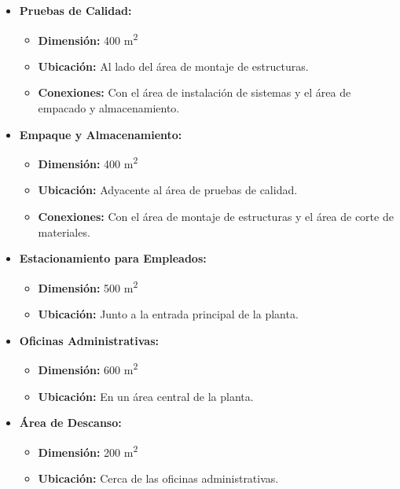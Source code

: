 \begin{itemize}
    \item \textbf{Pruebas de Calidad:}
    \begin{itemize}
        \item \textbf{Dimensión:} 400 m\textsuperscript{2}
        \item \textbf{Ubicación:} Al lado del área de montaje de estructuras.
        \item \textbf{Conexiones:} Con el área de instalación de sistemas y el área de empacado y almacenamiento.
    \end{itemize}

    \item \textbf{Empaque y Almacenamiento:}
    \begin{itemize}
        \item \textbf{Dimensión:} 400 m\textsuperscript{2}
        \item \textbf{Ubicación:} Adyacente al área de pruebas de calidad.
        \item \textbf{Conexiones:} Con el área de montaje de estructuras y el área de corte de materiales.
    \end{itemize}

    \item \textbf{Estacionamiento para Empleados:}
    \begin{itemize}
        \item \textbf{Dimensión:} 500 m\textsuperscript{2}
        \item \textbf{Ubicación:} Junto a la entrada principal de la planta.
    \end{itemize}

    \item \textbf{Oficinas Administrativas:}
    \begin{itemize}
        \item \textbf{Dimensión:} 600 m\textsuperscript{2}
        \item \textbf{Ubicación:} En un área central de la planta.
    \end{itemize}

    \item \textbf{Área de Descanso:}
    \begin{itemize}
        \item \textbf{Dimensión:} 200 m\textsuperscript{2}
        \item \textbf{Ubicación:} Cerca de las oficinas administrativas.
    \end{itemize}
\end{itemize}


